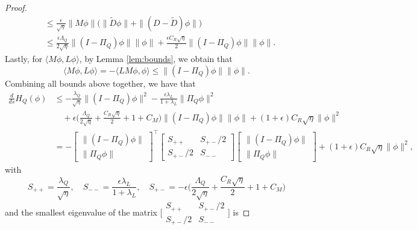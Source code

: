 \documentclass[11pt]{article}
\newcommand{\1}{\mathds{1}}
\begin{document}
\begin{proof}
\begin{equation}
\begin{aligned}
   &\leq \frac{\epsilon}{\sqrt{\eta}}\|M\phi\|\Big(\|\tilde{D}\phi\|+\|(D-\tilde{D})\phi\|\Big) \\
   &\leq \frac{\epsilon\Lambda_Q}{2\sqrt{\eta}}\|(I-\Pi_Q)\phi\|\|\phi\| + \frac{\epsilon C_R\sqrt{\eta}}{2} \|(I-\Pi_Q)\phi\| \|\phi\|.
\end{aligned}
\end{equation}
Lastly,  for $\langle M\phi, L \phi\rangle$, by Lemma \ref{lem:bounds}, we obtain that
\begin{equation}
    \langle M\phi, L \phi\rangle = -\langle LM\phi,  \phi\rangle\leq  \|(I-\Pi_Q)\phi\|\|\phi\|.
\end{equation}
Combining all bounds above together, we have that
\begin{equation}
\begin{aligned}
    \frac{d}{ds} H_Q(\phi) &\leq -\frac{\lambda_Q}{\sqrt{\eta}}\|(I-\Pi_Q)\phi\|^2-\frac{\epsilon\lambda_L}{1+\lambda_L} \|\Pi_Q\phi\|^2\\
    &\quad + \epsilon\Big(\frac{\Lambda_Q}{2\sqrt{\eta}}+\frac{C_R\sqrt{\eta}}{2}+1+C_M\Big)\|(I-\Pi_Q)\phi\|\|\phi\| + (1+\epsilon) C_R \sqrt{\eta} \|\phi\|^2\\
    & = -\begin{bmatrix}
            \|(I-\Pi_Q)\phi\| \\
            \|\Pi_Q\phi\|
        \end{bmatrix}^\top \begin{bmatrix}
            S_{++} & S_{+-}/2\\
          S_{+-}/2 & S_{--}
        \end{bmatrix} \begin{bmatrix}
            \|(I-\Pi_Q)\phi\| \\
            \|\Pi_Q\phi\| 
        \end{bmatrix}+(1+\epsilon)C_R \sqrt{\eta}\|\phi\|^2,
\end{aligned}
\end{equation}
with 
\begin{equation}
    S_{++} = \frac{\lambda_Q}{\sqrt{\eta}}, \quad S_{--} = \frac{\epsilon\lambda_L}{1+\lambda_L} , \quad S_{+-} = - \epsilon\Big(\frac{\Lambda_Q}{2\sqrt{\eta}}+\frac{C_R\sqrt{\eta}}{2}+1+C_M\Big)
\end{equation}
and the smallest eigenvalue of the matrix $\bigl[\begin{smallmatrix}
            S_{++} & S_{+-}/2\\
          S_{+-}/2 & S_{--}
        \end{smallmatrix} \bigr]$ is

\end{proof}
\end{document}
